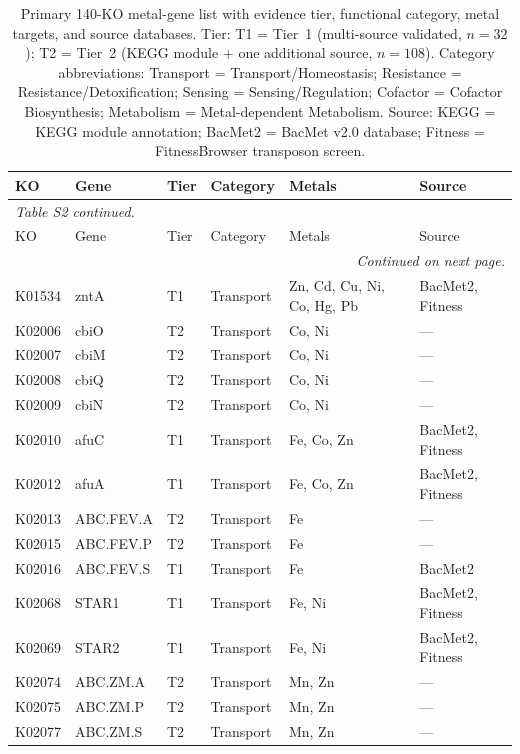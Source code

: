 \documentclass[11pt]{article}
\begin{document}
\begin{longtable}{@{}llllp{3.8cm}l@{}}
\caption{Primary 140-KO metal-gene list with evidence tier, functional category,
metal targets, and source databases.  Tier: T1 = Tier~1 (multi-source validated,
$n = 32$); T2 = Tier~2 (KEGG module + one additional source, $n = 108$).
Category abbreviations: Transport = Transport/Homeostasis;
Resistance = Resistance/Detoxification; Sensing = Sensing/Regulation;
Cofactor = Cofactor Biosynthesis; Metabolism = Metal-dependent Metabolism.
Source: KEGG = KEGG module annotation; BacMet2 = BacMet v2.0 database;
Fitness = FitnessBrowser transposon screen.}
\label{tab:ko_list}\\
\toprule
KO & Gene & Tier & Category & Metals & Source \\
\midrule
\endfirsthead
\multicolumn{6}{l}{\small\textit{Table S2 continued.}}\\
\toprule
KO & Gene & Tier & Category & Metals & Source \\
\midrule
\endhead
\midrule
\multicolumn{6}{r}{\small\textit{Continued on next page.}}\\
\endfoot
\bottomrule
\endlastfoot
K01534 & zntA & T1 & Transport & Zn, Cd, Cu, Ni, Co, Hg, Pb & BacMet2, Fitness \\
K02006 & cbiO & T2 & Transport & Co, Ni & --- \\
K02007 & cbiM & T2 & Transport & Co, Ni & --- \\
K02008 & cbiQ & T2 & Transport & Co, Ni & --- \\
K02009 & cbiN & T2 & Transport & Co, Ni & --- \\
K02010 & afuC & T1 & Transport & Fe, Co, Zn & BacMet2, Fitness \\
K02012 & afuA & T1 & Transport & Fe, Co, Zn & BacMet2, Fitness \\
K02013 & ABC.FEV.A & T2 & Transport & Fe & --- \\
K02015 & ABC.FEV.P & T2 & Transport & Fe & --- \\
K02016 & ABC.FEV.S & T1 & Transport & Fe & BacMet2 \\
K02068 & STAR1 & T1 & Transport & Fe, Ni & BacMet2, Fitness \\
K02069 & STAR2 & T1 & Transport & Fe, Ni & BacMet2, Fitness \\
K02074 & ABC.ZM.A & T2 & Transport & Mn, Zn & --- \\
K02075 & ABC.ZM.P & T2 & Transport & Mn, Zn & --- \\
K02077 & ABC.ZM.S & T2 & Transport & Mn, Zn & --- \\

\end{longtable}
\end{document}
